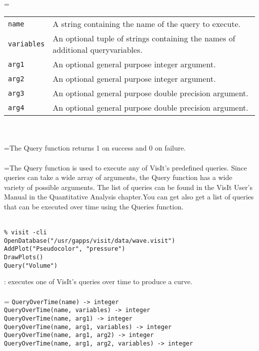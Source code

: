 \documentclass[10pt,a4paper]{report}
\begin{document}
 \\ 
\hangindent=\parindent 
\begin{tabular}{lp{9cm}}
\verb!name! & A string containing the name of the query to execute. \\
\verb!variables! & An optional tuple of strings containing the names of additional queryvariables. \\
\verb!arg1! & An optional general purpose integer argument. \\
\verb!arg2! & An optional general purpose integer argument. \\
\verb!arg3! & An optional general purpose double precision argument. \\
\verb!arg4! & An optional general purpose double precision argument. \\
\end{tabular} \\[-2mm]


 \\ 
\hangindent=\parindent The Query function returns 1 on success and 0 on failure. \\[-3mm] 

 \\ 
\hangindent=\parindent The Query function is used to execute any of VisIt's predefined queries. Since queries can take a wide array of arguments, the Query function has a wide variety of possible arguments. The list of queries can be found in the VisIt User's Manual in the Quantitative Analysis chapter.You can get also get a list of queries that can be executed over time using the Queries function. \\[-3mm] 

\\[-6mm]
\begin{verbatim}% visit -cli
OpenDatabase("/usr/gapps/visit/data/wave.visit")
AddPlot("Pseudocolor", "pressure")
DrawPlots()
Query("Volume")
\end{verbatim}
\newpage


{}
: executes one of VisIt's queries over time to produce a curve.\\[-3mm]

 \\ 
\hangindent=\parindent 
\verb!QueryOverTime(name) -> integer!\\ 
\verb!QueryOverTime(name, variables) -> integer!\\ 
\verb!QueryOverTime(name, arg1) -> integer!\\ 
\verb!QueryOverTime(name, arg1, variables) -> integer!\\ 
\verb!QueryOverTime(name, arg1, arg2) -> integer!\\ 
\verb!QueryOverTime(name, arg1, arg2, variables) -> integer!\\ [-3mm]
\end{document}
